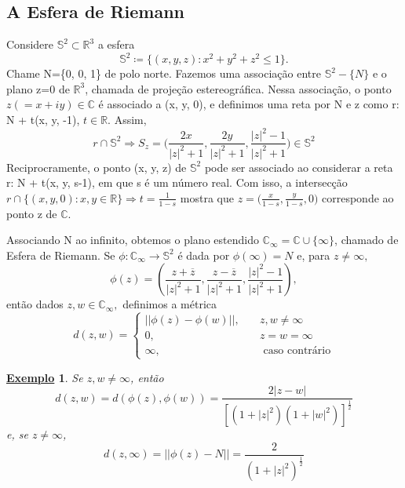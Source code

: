 \documentclass{article}
\newtheorem{example}{\underline{Exemplo}}[section]
\begin{document}
  \subsection{A Esfera de Riemann}
  Considere $\mathbb{S}^{2}\subset{\mathbb{R}^{3}}$ a esfera 
  $$
  \mathbb{S}^{2}\coloneqq  \{(x, y, z): x ^{2} + y ^{2} + z ^{2}\leq{1}\}.
  $$
  Chame N=\{0, 0, 1\} de polo norte. Fazemos uma associa\c c\~ao entre $\mathbb{S}^{2}-\{N\}$ e o plano z=0 de $\mathbb{R}^{3}$,
  chamada de proje\c c\~ao estereogr\'afica. Nessa associa\c c\~ao, o ponto $z(=x + iy)\in\mathbb{C}$ \'e associado a (x, y, 0), e
  definimos uma reta por N e z como r: N + t(x, y, -1), $t\in \mathbb{R}$. Assim,
  $$
  r\cap{\mathbb{S}^{2}} \Rightarrow S _{z} = \biggl(\frac{2x}{|z|^{2}+1}, \frac{2y}{|z|^{2}+1}, \frac{|z|^{2}-1}{|z|^{2}+1}\biggr)\in \mathbb{S}^{2}
  $$
  Reciprocramente, o ponto (x, y, z) de $\mathbb{S}^{2}$ pode ser associado ao considerar a reta r: N + t(x, y, s-1), em que
  s \'e um n\'umero real. Com isso, a intersec\c c\~ao $r\cap \{(x, y, 0): x, y \in \mathbb{R}\}\Rightarrow t=\frac{1}{1-s}$ mostra que 
  $z = \biggl(\frac{x}{1-s}, \frac{y}{1-s}, 0\biggr)$ corresponde ao ponto z de $\mathbb{C}$.

  Associando N ao infinito, obtemos o plano estendido $\mathbb{C}_{\infty} = \mathbb{C}\cup \{\infty\}$, chamado de Esfera de Riemann. Se $\phi:\mathbb{C}_{\infty}\rightarrow \mathbb{S}^{2}$
  \'e dada por $\phi(\infty) = N$ e, para $z\neq{\infty},$
  $$
  \phi(z) = (\frac{z + \overline{z}}{|z|^{2} + 1}, \frac{z - \overline{z}}{|z|^{2}+1}, \frac{|z|^{2}-1}{|z|^{2}+1}),
  $$
  ent\~ao dados $z, w\in \mathbb{C}_{\infty},$ definimos a m\'etrica
  $$
  d(z, w)=\left\{
    \begin{array}{ll}
      ||\phi(z) - \phi(w)||, & \quad z, w\neq{\infty} \\
      0, & \quad z = w = \infty \\
      \infty, & \quad \text{ caso contr\'ario}
  \end{array}\right.
  $$
  \begin{example}
    Se $z, w\neq{\infty}$, ent\~ao
    $$
    d(z, w) = d(\phi(z), \phi(w)) = \frac{2|z - w|}{[(1+|z|^{2})(1+|w|^{2})]^{\frac{1}{2}}}
    $$
    e, se $z\neq\infty$,
    $$
    d(z, \infty) = ||\phi(z) - N|| = \frac{2}{(1+|z|^{2})^{\frac{1}{2}}}
    $$
  \end{example}
\end{document}
